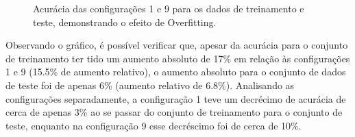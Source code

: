\documentclass[twocolumn]{article}
\begin{document}
    \begin{figure}[ht]
        \centering{}
        \def\svgwidth{\columnwidth}
        
        \caption{%
            Acurácia das configurações 1 e 9 para os dados de treinamento e
            teste, demonstrando o efeito de Overfitting.\label{overfitting}
        }
    \end{figure}

    Observando o gráfico, é possível verificar que, apesar da acurácia para o
    conjunto de treinamento ter tido um aumento absoluto de 17\% em relação às
    configurações 1 e 9 (15.5\% de aumento relativo), o aumento absoluto para o
    conjunto de dados de teste foi de apenas 6\% (aumento relativo de 6.8\%).
    Analisando as configurações separadamente, a configuração 1 teve um
    decrécimo de acurácia de cerca de apenas 3\% ao se passar do conjunto de
    treinamento para o conjunto de teste, enquanto na configuração 9 esse
    decréscimo foi de cerca de 10\%.

    
    
    \nocite{*}
\end{document}
